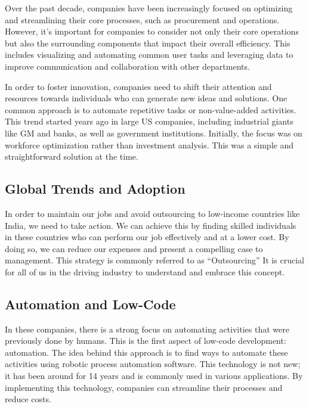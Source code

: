 Over the past decade, companies have
been increasingly focused on optimizing and streamlining their core
processes, such as procurement and operations. However, it's important
for companies to consider not only their core operations but also the
surrounding components that impact their overall efficiency. This
includes visualizing and automating common user tasks and leveraging
data to improve communication and collaboration with other departments.

In order to foster innovation, companies need to shift their attention
and resources towards individuals who can generate new ideas and
solutions. One common approach is to automate repetitive tasks or
non-value-added activities. This trend started years ago in large US
companies, including industrial giants like GM and banks, as well as
government institutions. Initially, the focus was on workforce
optimization rather than investment analysis. This was a simple and
straightforward solution at the time.

\subsection{Global Trends and
    Adoption}\label{global-trends-and-adoption}

In order to maintain our jobs and avoid outsourcing to
low-income countries like India, we need to take action. We can achieve
this by finding skilled individuals in these countries who can perform
our job effectively and at a lower cost. By doing so, we can reduce our
expenses and present a compelling case to management. This strategy is
commonly referred to as ``Outsourcing'' It is crucial for all
of us in the driving industry to understand and embrace this concept.

\subsection{Automation and Low-Code}\label{automation-and-low-code}

In these companies, there is a strong focus on automating activities
that were previously done by humans. This is the first aspect of
low-code development: automation. The idea behind this approach is to
find ways to automate these activities using robotic process automation
software. This technology is not new; it has been around for 14 years
and is commonly used in various applications. By implementing this
technology, companies can streamline their processes and reduce costs.

